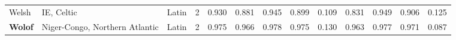 \begin{tabular}{lllrrrrrrrrrr}
                          Welsh &                      IE, Celtic &      Latin &         2 &                       0.930 &                         0.881 &         0.945 &                  0.899 &            0.109 &                         0.831 &         0.949 &                  0.906 &            0.125 \\
                 \textbf{Wolof} &  Niger-Congo, Northern Atlantic &      Latin &         2 &                       0.975 &                         0.966 &         0.978 &                  0.975 &            0.130 &                         0.963 &         0.977 &                  0.971 &            0.087 \\
\bottomrule
\end{tabular}
